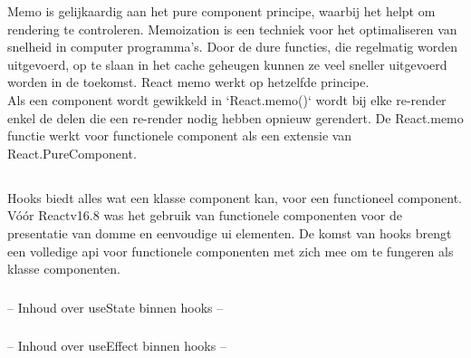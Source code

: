 Memo is gelijkaardig aan het pure component principe, waarbij het helpt om rendering te controleren. Memoization is een techniek voor het optimaliseren van snelheid in computer programma's. Door de dure functies, die regelmatig worden uitgevoerd, op te slaan in het cache geheugen kunnen ze veel sneller uitgevoerd worden in de toekomst. React memo werkt op hetzelfde principe.\\
Als een component wordt gewikkeld in `React.memo()` wordt bij elke re-render enkel de delen die een re-render nodig hebben opnieuw gerendert. De React.memo functie werkt voor functionele component als een extensie van React.PureComponent.


\subsection{}
\label{sec:hooks}

Hooks biedt alles wat een klasse component kan, voor een functioneel component. Vóór Reactv16.8 was het gebruik van functionele componenten voor de presentatie van domme en eenvoudige \gls{ui} elementen. De komst van hooks brengt een volledige \gls{api} voor functionele componenten met zich mee om te fungeren als klasse componenten.\\

\subsubsection{}
\label{sec:useState}

-- Inhoud over useState binnen hooks --

\subsubsection{}
\label{sec:useEffect}

-- Inhoud over useEffect binnen hooks --

\subsubsection{}
\label{sec:useCallback}

